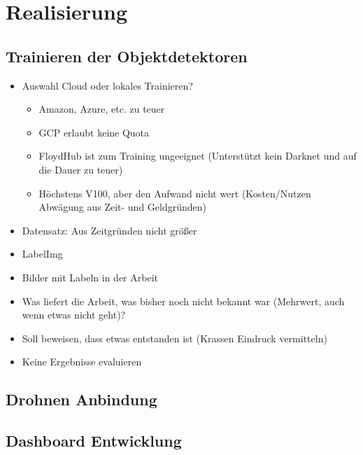 \chapter{Realisierung}

\section{Trainieren der Objektdetektoren}

\begin{itemize}
	\item Auswahl Cloud oder lokales Trainieren?
	\begin{itemize}
		\item Amazon, Azure, etc. zu teuer
		\item GCP erlaubt keine Quota
		\item FloydHub ist zum Training ungeeignet (Unterstützt kein Darknet und auf die Dauer zu teuer)
		\item Höchstens V100, aber den Aufwand nicht wert (Kosten/Nutzen Abwägung aus Zeit- und Geldgründen)
	\end{itemize}
	\item Datensatz: Aus Zeitgründen nicht größer
	\item LabelImg
	\item Bilder mit Labeln in der Arbeit
	\item Was liefert die Arbeit, was bisher noch nicht bekannt war (Mehrwert, auch wenn etwas nicht geht)?
	\item Soll beweisen, dass etwas entstanden ist (Krassen Eindruck vermitteln)
	\item Keine Ergebnisse evaluieren
\end{itemize}

\section{Drohnen Anbindung}

\section{Dashboard Entwicklung}
